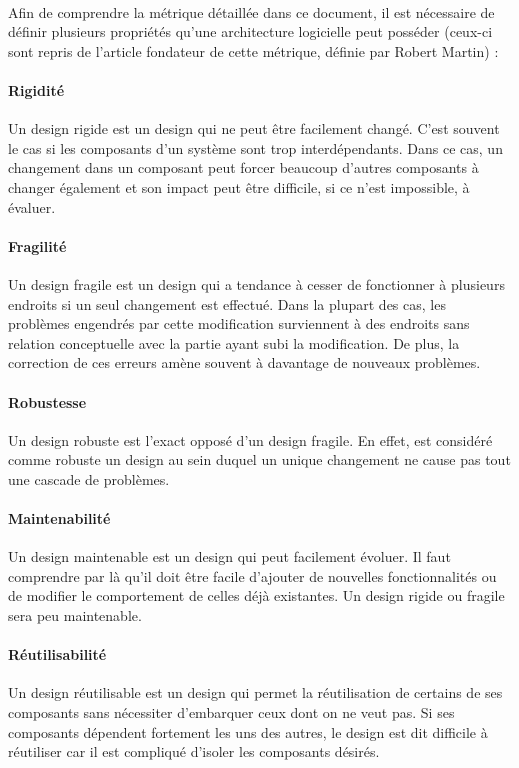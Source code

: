 \documentclass{scrartcl}
\begin{document}
    \paragraph{}Afin de comprendre la métrique détaillée dans ce document, il est nécessaire de définir plusieurs propriétés qu'une architecture logicielle peut posséder (ceux-ci sont repris de l'article fondateur de cette métrique, définie par Robert Martin\cite{Martin:1994}) :

    \paragraph{Rigidité}Un design rigide est un design qui ne peut être facilement changé. C'est souvent le cas si les composants d'un système sont trop interdépendants. Dans ce cas, un changement dans un composant peut forcer beaucoup d'autres composants à changer également et son impact peut être difficile, si ce n'est impossible, à évaluer.

    \paragraph{Fragilité}Un design fragile est un design qui a tendance à cesser de fonctionner à plusieurs endroits si un seul changement est effectué. Dans la plupart des cas, les problèmes engendrés par cette modification surviennent à des endroits sans relation conceptuelle avec la partie ayant subi la modification. De plus, la correction de ces erreurs amène souvent à davantage de nouveaux problèmes.

    \paragraph{Robustesse}Un design robuste est l'exact opposé d'un design fragile. En effet, est considéré comme robuste un design au sein duquel un unique changement ne cause pas tout une cascade de problèmes.

    \paragraph{Maintenabilité}Un design maintenable est un design qui peut facilement évoluer. Il faut comprendre par là qu'il doit être facile d'ajouter de nouvelles fonctionnalités ou de modifier le comportement de celles déjà existantes. Un design rigide ou fragile sera peu maintenable.

    \paragraph{Réutilisabilité}Un design réutilisable est un design qui permet la réutilisation de certains de ses composants sans nécessiter d'embarquer ceux dont on ne veut pas. Si ses composants dépendent fortement les uns des autres, le design est dit difficile à réutiliser car il est compliqué d'isoler les composants désirés.
    
\end{document}
